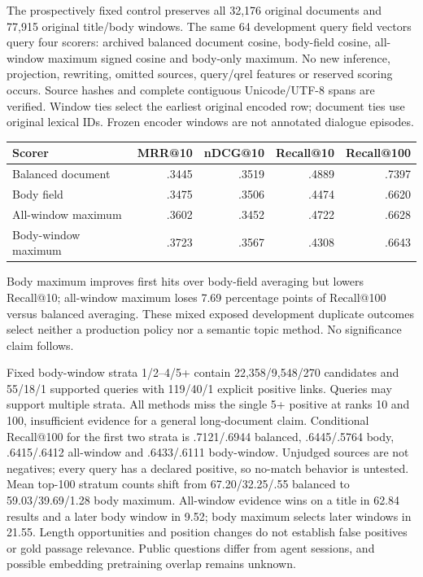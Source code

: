\documentclass[11pt]{article}
\begin{document}
The prospectively fixed control preserves all 32,176 original documents and
77,915 original title/body windows. The same 64 development query field vectors
query four scorers: archived balanced document cosine, body-field cosine,
all-window maximum signed cosine and body-only maximum. No new inference,
projection, rewriting, omitted sources, query/qrel features or reserved scoring
occurs. Source hashes and complete contiguous Unicode/UTF-8 spans are verified.
Window ties select the earliest original encoded row; document ties use original
lexical IDs. Frozen encoder windows are not annotated dialogue episodes.

\begin{center}\begin{tabular}{lrrrr}\toprule
Scorer & MRR@10 & nDCG@10 & Recall@10 & Recall@100\\\midrule
Balanced document & .3445 & .3519 & .4889 & .7397\\
Body field & .3475 & .3506 & .4474 & .6620\\
All-window maximum & .3602 & .3452 & .4722 & .6628\\
Body-window maximum & .3723 & .3567 & .4308 & .6643\\\bottomrule
\end{tabular}\end{center}
Body maximum improves first hits over body-field averaging but lowers Recall@10;
all-window maximum loses 7.69 percentage points of Recall@100 versus balanced
averaging. These mixed exposed development duplicate outcomes select neither
a production policy nor a semantic topic method. No significance claim follows.

Fixed body-window strata 1/2--4/5+ contain 22,358/9,548/270 candidates and
55/18/1 supported queries with 119/40/1 explicit positive links. Queries may
support multiple strata. All methods miss the single 5+ positive at ranks
10 and 100, insufficient evidence for a general long-document claim. Conditional
Recall@100 for the first two strata is .7121/.6944 balanced, .6445/.5764 body,
.6415/.6412 all-window and .6433/.6111 body-window. Unjudged sources are not
negatives; every query has a declared positive, so no-match behavior is untested.
Mean top-100 stratum counts shift from 67.20/32.25/.55 balanced to
59.03/39.69/1.28 body maximum. All-window evidence wins on a title in 62.84
results and a later body window in 9.52; body maximum selects later windows in
21.55. Length opportunities and position changes do not establish false positives
or gold passage relevance. Public questions differ from agent sessions, and
possible embedding pretraining overlap remains unknown.
\end{document}
